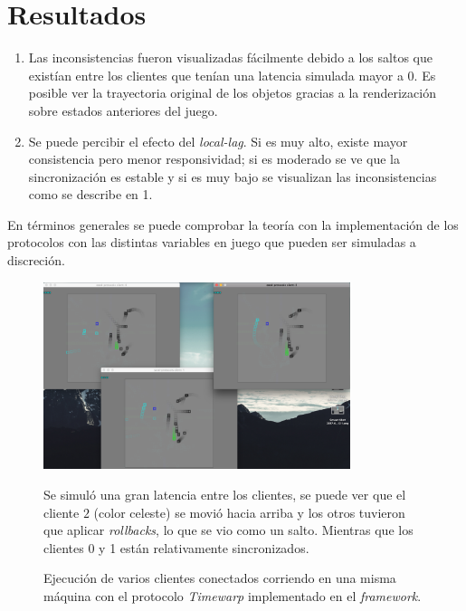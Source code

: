 \section{Resultados}

\begin{enumerate}
	\item Las inconsistencias fueron visualizadas fácilmente debido a los saltos que existían entre los clientes que tenían una latencia simulada mayor a 0. Es posible ver la trayectoria original de los objetos gracias a la renderización sobre estados anteriores del juego.
	\item Se puede percibir el efecto del \emph{local-lag}. Si es muy alto, existe mayor consistencia pero menor responsividad; si es moderado se ve que la sincronización es estable y si es muy bajo se visualizan las inconsistencias como se describe en 1.
\end{enumerate}

En términos generales se puede comprobar la teoría con la implementación de los protocolos con las distintas variables en juego que pueden ser simuladas a discreción.


\begin{figure}[h]
\centering
\includegraphics[width=0.8\textwidth]{run}
\caption{\label{fig:execution} \small Ejecución de varios clientes conectados corriendo en una misma máquina con el protocolo \emph{Timewarp} implementado en el \emph{framework}.} Se simuló una gran latencia entre los clientes, se puede ver que el cliente $2$ (color celeste) se movió hacia arriba y los otros tuvieron que aplicar \emph{rollbacks}, lo que se vio como un salto. Mientras que los clientes 0 y 1 están relativamente sincronizados.
\end{figure}


